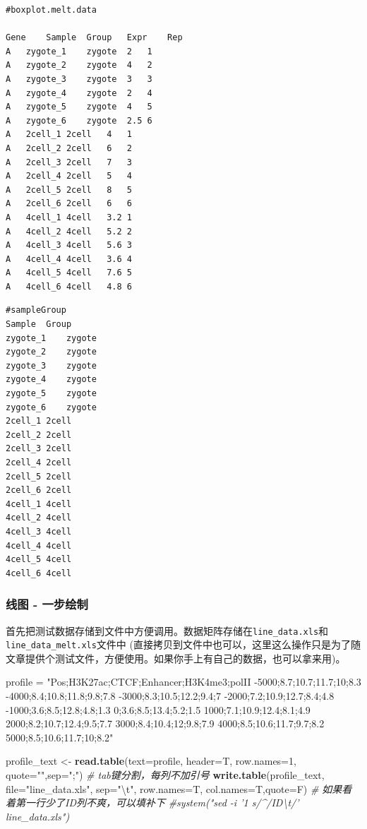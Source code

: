 \documentclass[]{article}
\newenvironment{Shaded}{\begin{snugshade}}{\end{snugshade}}
\newcommand{\KeywordTok}[1]{\textcolor[rgb]{0.13,0.29,0.53}{\textbf{{#1}}}}
\newcommand{\DataTypeTok}[1]{\textcolor[rgb]{0.13,0.29,0.53}{{#1}}}
\newcommand{\DecValTok}[1]{\textcolor[rgb]{0.00,0.00,0.81}{{#1}}}
\newcommand{\CharTok}[1]{\textcolor[rgb]{0.31,0.60,0.02}{{#1}}}
\newcommand{\StringTok}[1]{\textcolor[rgb]{0.31,0.60,0.02}{{#1}}}
\newcommand{\CommentTok}[1]{\textcolor[rgb]{0.56,0.35,0.01}{\textit{{#1}}}}
\newcommand{\NormalTok}[1]{{#1}}
\numberwithin{figure}{section}
\numberwithin{table}{section}
\theoremstyle{definition}
\theoremstyle{definition}
\theoremstyle{definition}
\theoremstyle{remark}
\begin{document}
\begin{verbatim}
#boxplot.melt.data

Gene    Sample  Group   Expr    Rep
A   zygote_1    zygote  2   1
A   zygote_2    zygote  4   2
A   zygote_3    zygote  3   3
A   zygote_4    zygote  2   4
A   zygote_5    zygote  4   5
A   zygote_6    zygote  2.5 6
A   2cell_1 2cell   4   1
A   2cell_2 2cell   6   2
A   2cell_3 2cell   7   3
A   2cell_4 2cell   5   4
A   2cell_5 2cell   8   5
A   2cell_6 2cell   6   6
A   4cell_1 4cell   3.2 1
A   4cell_2 4cell   5.2 2
A   4cell_3 4cell   5.6 3
A   4cell_4 4cell   3.6 4
A   4cell_5 4cell   7.6 5
A   4cell_6 4cell   4.8 6
\end{verbatim}

\begin{verbatim}
#sampleGroup
Sample  Group
zygote_1    zygote
zygote_2    zygote
zygote_3    zygote
zygote_4    zygote
zygote_5    zygote
zygote_6    zygote
2cell_1 2cell
2cell_2 2cell
2cell_3 2cell
2cell_4 2cell
2cell_5 2cell
2cell_6 2cell
4cell_1 4cell
4cell_2 4cell
4cell_3 4cell
4cell_4 4cell
4cell_5 4cell
4cell_6 4cell
\end{verbatim}

\subsubsection{线图 - 一步绘制}\label{---}

首先把测试数据存储到文件中方便调用。数据矩阵存储在\texttt{line\_data.xls}和\texttt{line\_data\_melt.xls}文件中
(直接拷贝到文件中也可以，这里这么操作只是为了随文章提供个测试文件，方便使用。如果你手上有自己的数据，也可以拿来用)。

\begin{Shaded}
\begin{Highlighting}[]
\NormalTok{profile =}\StringTok{ "Pos;H3K27ac;CTCF;Enhancer;H3K4me3;polII}
\StringTok{-5000;8.7;10.7;11.7;10;8.3}
\StringTok{-4000;8.4;10.8;11.8;9.8;7.8}
\StringTok{-3000;8.3;10.5;12.2;9.4;7}
\StringTok{-2000;7.2;10.9;12.7;8.4;4.8}
\StringTok{-1000;3.6;8.5;12.8;4.8;1.3}
\StringTok{0;3.6;8.5;13.4;5.2;1.5}
\StringTok{1000;7.1;10.9;12.4;8.1;4.9}
\StringTok{2000;8.2;10.7;12.4;9.5;7.7}
\StringTok{3000;8.4;10.4;12;9.8;7.9}
\StringTok{4000;8.5;10.6;11.7;9.7;8.2}
\StringTok{5000;8.5;10.6;11.7;10;8.2"}

\NormalTok{profile_text <-}\StringTok{ }\KeywordTok{read.table}\NormalTok{(}\DataTypeTok{text=}\NormalTok{profile, }\DataTypeTok{header=}\NormalTok{T, }\DataTypeTok{row.names=}\DecValTok{1}\NormalTok{, }\DataTypeTok{quote=}\StringTok{""}\NormalTok{,}\DataTypeTok{sep=}\StringTok{";"}\NormalTok{)}
\CommentTok{# tab键分割，每列不加引号}
\KeywordTok{write.table}\NormalTok{(profile_text, }\DataTypeTok{file=}\StringTok{"line_data.xls"}\NormalTok{, }\DataTypeTok{sep=}\StringTok{"}\CharTok{\textbackslash{}t}\StringTok{"}\NormalTok{, }\DataTypeTok{row.names=}\NormalTok{T, }\DataTypeTok{col.names=}\NormalTok{T,}\DataTypeTok{quote=}\NormalTok{F)}
\CommentTok{# 如果看着第一行少了ID列不爽，可以填补下}
\CommentTok{#system("sed -i '1 s/^/ID\textbackslash{}t/' line_data.xls")}
\end{Highlighting}
\end{Shaded}
\end{document}
